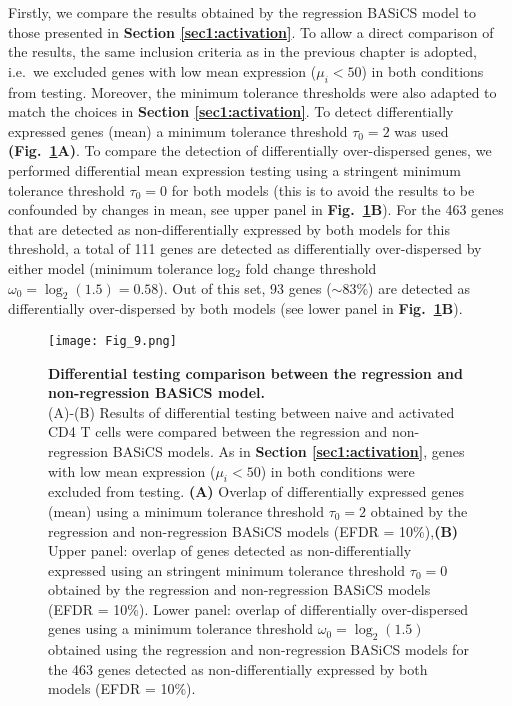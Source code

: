 Firstly, we compare the results obtained by the regression BASiCS model to those presented in \textbf{Section \ref{sec1:activation}}.  
To allow a direct comparison of the results, the same inclusion criteria as in the previous chapter is adopted, i.e.~we excluded genes with low mean expression ($\mu_i<50$) in both conditions from testing. Moreover, the minimum tolerance thresholds were also adapted to match the choices in \textbf{Section \ref{sec1:activation}}. To detect differentially expressed genes (mean) a minimum tolerance threshold $\tau_0 = 2$ was used \textbf{(Fig.~\ref{fig2:model_comparison}A)}. To compare the detection of differentially over-dispersed genes, we performed differential mean expression testing using a stringent minimum tolerance threshold $\tau_0 = 0$ for both models (this is to avoid the results to be confounded by changes in mean, see upper panel in \textbf{Fig.~\ref{fig2:model_comparison}B}). For the 463 genes that are detected as non-differentially expressed by both models for this threshold, a total of 111 genes are detected as differentially over-dispersed by either model (minimum tolerance log$_2$ fold change threshold $\omega_0 = \log_2(1.5) = 0.58$). Out of this set, 93 genes ($\sim$83\%) are detected as differentially over-dispersed by both models (see lower panel in \textbf{Fig.~\ref{fig2:model_comparison}B}).

\newpage

\begin{figure}[!h]
\centering
\texttt{[image: Fig\_9.png]}
\caption[Differential testing comparison between the regression and non-regression BASiCS model]{\textbf{Differential testing comparison between the regression and non-regression BASiCS model.}\\
(A)-(B) Results of differential testing between naive and activated CD4\plus{} T cells were compared between the regression and non-regression BASiCS models. As in \textbf{Section \ref{sec1:activation}}, genes with low mean expression ($\mu_i<50$) in both conditions were excluded from testing. \textbf{(A)} Overlap of differentially expressed genes (mean) using a minimum tolerance threshold $
\tau_0=2$ obtained by the regression and non-regression BASiCS models (EFDR = 10\%),\textbf{(B)} Upper panel: overlap of genes detected as non-differentially expressed using an stringent minimum tolerance threshold $\tau_0=0$ obtained by the regression and non-regression BASiCS models (EFDR = 10\%). Lower panel: overlap of differentially over-dispersed genes using a minimum tolerance threshold $\omega_0=\log_2(1.5)$ obtained using the regression and non-regression  BASiCS models for the 463 genes detected as non-differentially expressed by both models (EFDR = 10\%).\\}
\label{fig2:model_comparison}
\end{figure}


